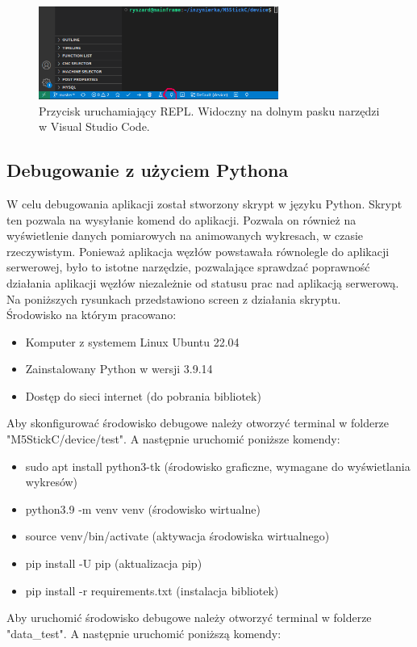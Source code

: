 \documentclass[12pt,oneside,a4paper]{book}
\theoremstyle{break}
\begin{document}
\begin{figure}[H]
    \begin{center}
        \includegraphics[width=0.7\textwidth]{vsc-monitor.png}
        \caption{Przycisk uruchamiający REPL. Widoczny na dolnym pasku narzędzi w Visual Studio Code.}
        \label{rys:vsc-monitor}
    \end{center}
\end{figure}

\subsection{Debugowanie z użyciem Pythona}

W celu debugowania aplikacji został stworzony skrypt w języku Python. Skrypt ten pozwala na
wysyłanie komend do aplikacji. Pozwala on również
na wyświetlenie danych pomiarowych na animowanych wykresach, w czasie rzeczywistym. Ponieważ aplikacja węzłów
powstawała równolegle do aplikacji serwerowej, było to istotne narzędzie, pozwalające sprawdzać poprawność
działania aplikacji węzłów niezależnie od statusu prac nad aplikacją serwerową. Na poniższych rysunkach przedstawiono
screen z działania skryptu.\\
Środowisko na którym pracowano:
\begin{itemize}
    \item Komputer z systemem Linux Ubuntu 22.04
    \item Zainstalowany Python w wersji 3.9.14
    \item Dostęp do sieci internet (do pobrania bibliotek)
\end{itemize}
Aby skonfigurować środowisko debugowe należy otworzyć terminal w folderze "M5StickC/device/test".
A następnie uruchomić poniższe komendy:
\begin{itemize}
    \item sudo apt install python3-tk (środowisko graficzne, wymagane do wyświetlania wykresów)
    \item python3.9 -m venv venv (środowisko wirtualne)
    \item source venv/bin/activate (aktywacja środowiska wirtualnego)
    \item pip install -U pip (aktualizacja pip)
    \item pip install -r requirements.txt (instalacja bibliotek)
\end{itemize}
Aby uruchomić środowisko debugowe należy otworzyć terminal w folderze "data\_test".
A następnie uruchomić poniższą komendy:
\end{document}
